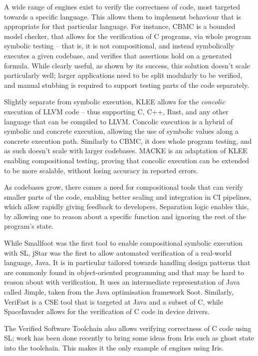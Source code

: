 A wide range of engines exist to verify the correctness of code, most targeted towards a specific language. This allows them to implement behaviour that is appropriate for that particular language.
For instance, CBMC \cite{cbmc} is a bounded model checker, that allows for the verification of C programs, via whole program symbolic testing -- that is, it is not compositional, and instead symbolically executes a given codebase, and verifies that assertions hold on a generated formula. While clearly useful, as shown by its success, this solution doesn't scale particularly well; larger applications need to be split modularly to be verified, and manual stubbing is required to support testing parts of the code separately.

Slightly separate from symbolic execution, KLEE \cite{klee} allows for the \emph{concolic} execution of LLVM code -- thus supporting C, C++, Rust, and any other language that can be compiled to LLVM. Concolic execution is a hybrid of symbolic and concrete execution, allowing the use of symbolic values along a concrete execution path. Similarly to CBMC, it does whole program testing, and as such doesn't scale with larger codebases. MACKE \cite{macke} is an adaptation of KLEE enabling compositional testing, proving that concolic execution can be extended to be more scalable, without losing accuracy in reported errors.

As codebases grow, there comes a need for compositional tools that can verify smaller parts of the code, enabling better scaling and integration in CI pipelines, which allow rapidly giving feedback to developers. Separation logic enables this, by allowing one to reason about a specific function and ignoring the rest of the program's state.

While Smallfoot \cite{smallfoot} was the first tool to enable compositional symbolic execution with SL, jStar \cite{jstar} was the first to allow automated verification of a real-world language, Java. It is in particular tailored towards handling design patterns that are commonly found in object-oriented programming and that may be hard to reason about with verification. It uses an intermediate representation of Java called Jimple, taken from the Java optimisation framework Soot. Similarly, VeriFast \cite{verifast} is a CSE tool that is targeted at Java and a subset of C, while SpaceInvader \cite{spaceinvader} allows for the verification of C code in device drivers.

The Verified Software Toolchain \cite{vstiris} also allows verifying correctness of C code using SL; work has been done recently to bring some ideas from Iris such as ghost state into the toolchain. This makes it the only example of engines using Iris.

